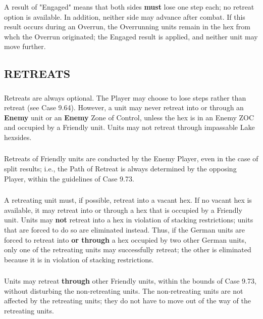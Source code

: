 \subsubsection{} A result of "Engaged" means that both sides \textbf{must} lose one step each; no retreat option is available. In addition, neither side may advance after combat. If this result occurs during an Overrun, the Overrunning units remain in the hex from whch the Overrun originated; the Engaged result is applied, and neither unit may move further.

\subsection{RETREATS}

\subsubsection{} Retreats are always optional. The Player may choose to lose steps rather than retreat (see Case 9.64). However, a unit may never retreat into or through an \textbf{Enemy} unit or an \textbf{Enemy} Zone of Control, unless the hex is in an Enemy ZOC and occupied by a Friendly unit. Units may not retreat through impassable Lake hexsides.

\subsubsection{} Retreats of Friendly units are conducted by the Enemy Player, even in the case of split results; i.e., the Path of Retreat is always determined by the opposing Player, within the guidelines of Case 9.73.

\subsubsection{} A retreating unit must, if possible, retreat into a vacant hex. If no vacant hex is available, it may retreat into or through a hex that is occupied by a Friendly unit. Units may \textbf{not} retreat into a hex in violation of stacking restrictions; units that are forced to do so are eliminated instead. Thus, if the German units are forced to retreat into \textbf{or through} a hex occupied by two other German units, only one of the retreating units may successfully retreat; the other is eliminated because it is in violation of stacking restrictions.

\subsubsection{} Units may retreat \textbf{through} other Friendly units, within the bounds of Case 9.73, without disturbing the non-retreating units. The non-retreating units are not affected by the retreating units; they do not have to move out of the way of the retreating units.

